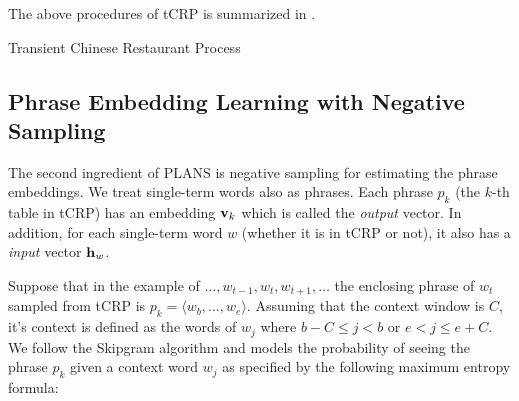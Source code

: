 The above procedures of tCRP is summarized in .

\begin{algorithm}[h!]
  \caption{Transient Chinese Restaurant Process}\label{alg::tcrp}
  \SetAlgoNoLine
\end{algorithm}

\subsection{Phrase Embedding Learning with Negative Sampling}

The second ingredient of PLANS is negative sampling for estimating the phrase
embeddings. We treat single-term words also as phrases. Each phrase ${p_k}$ (the
$k$-th table in tCRP) has an embedding $\mathbf{v}_k$ which is called the \emph{output}
vector. In addition, for each single-term word $w$ (whether it is in tCRP or
not), it also has a \emph{input} vector $\mathbf{h}_w$.

Suppose that in the example of $\dots, w_{t-1}, w_t, w_{t+1}, \dots$ the
enclosing phrase of $w_t$ sampled from tCRP is $p_k = \langle w_b, \dots, w_e
\rangle$. Assuming that the context window is $C$, it's context is defined as
the words of $w_j$ where $b - C \le j < b$ or $e < j \le e + C$. We follow the
Skipgram algorithm and models the probability of seeing the phrase $p_k$ given a
context word $w_j$ as specified by the following maximum entropy formula:

